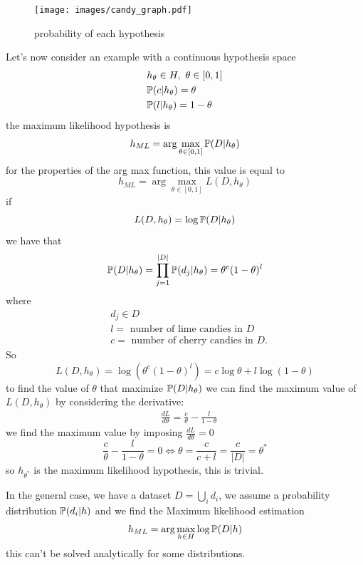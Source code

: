 \documentclass[10pt, letterpaper]{report}
\begin{document}
\begin{figure}[h!]
    \centering
    \texttt{[image: images/candy\_graph.pdf]}
    \caption{probability of each hypothesis}
    \label{img:candy_graph}
\end{figure}
\noindent
Let's now consider an example with a continuous hypothesis space\begin{align}
    &h_\theta\in H, \ \theta\in[0,1]\\
    &{\mathbb P}(c|h_\theta)=\theta\\
    &{\mathbb P}(l|h_\theta)=1-\theta
\end{align}
the maximum likelihood hypothesis is\begin{equation}
    h_{ML}=\arg\max_{\theta\in[0,1]}{\mathbb P}(D|h_\theta)
\end{equation}
for the properties of the arg max function, this value is equal to
\begin{equation}
    h_{ML}=\arg\max_{\theta\in[0,1]}L(D,h_\theta)
\end{equation}
if \begin{equation}
    L(D,h_\theta)=\log{\mathbb P}(D|h_\theta)
\end{equation}
we have that\begin{equation}
    {\mathbb P}(D|h_{\theta})=\prod_{j=1}^{|D|}{\mathbb P}(d_j|h_\theta)=\theta^c(1-\theta)^l
\end{equation}
where\begin{align*}
    &d_j\in D\\
    &l = \text{ number of lime candies in }D\\
    &c = \text{ number of cherry candies in }D.
\end{align*}
So\begin{equation}
    L(D,h_\theta)=\log(\theta^c(1-\theta)^l)=c\log\theta+l\log(1-\theta)
\end{equation}
to find the value of $\theta$ that maximize ${\mathbb P}(D|h_\theta)$ we can find the maximum value of $ L(D,h_\theta)$ by considering the derivative:\begin{align*}
    &\frac{dL}{d\theta}=\frac{c}{\theta}-\frac{l}{1-\theta}
\end{align*}
we find the maximum value by imposing $\frac{dL}{d\theta}=0$\begin{equation}
    \frac{c}{\theta}-\frac{l}{1-\theta}=0\iff \theta=\frac{c}{c+l}=\frac{c}{|D|}=\theta^*
\end{equation}
so $h_{\theta^*}$ is the maximum likelihood hypothesis, this is trivial.\bigskip

In the general case, we have a dataset $D=\bigcup_i d_i$, we assume a probability distribution ${\mathbb P}(d_i|h)$ and we find the Maximum likelihood estimation\begin{equation}
    h_{ML}=\arg\max_{h\in H}\log{\mathbb P}(D|h)
\end{equation}
this can't be solved analytically for some distributions.
\end{document}
